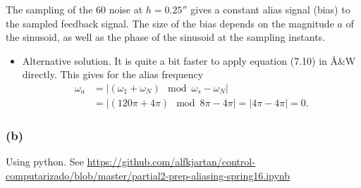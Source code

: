 \documentclass{scrartcl}
\begin{document}
The sampling of the \unit{60}{\hertz} noise at \(h=\unit{0.25}{\second}\) gives a constant alias signal (bias) to the sampled feedback signal. The size of the bias depends on the magnitude \(a\) of the sinusoid, as well as the phase of the sinusoid at the sampling instants.


\begin{itemize}
\item Alternative solution.
\label{sec:orgheadline17}
It is quite a bit faster to apply equation (7.10) in Å\&W directly. This gives for the alias frequency
\begin{equation*}
 \begin{split}
  \omega_a &= | (\omega_1 + \omega_N) \mod \omega_s - \omega_N| \\
	   &= | (120\pi + 4\pi) \mod 8\pi - 4\pi | = |4\pi - 4\pi| = 0.
 \end{split}
\end{equation*}
\end{itemize}
\subsubsection*{(b)}
\label{sec:orgheadline19}
Using python. See \url{https://github.com/alfkjartan/control-computarizado/blob/master/partial2-prep-aliasing-spring16.ipynb}
\end{document}
